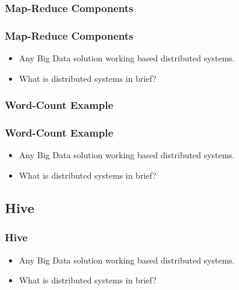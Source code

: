 
\subsubsection{Map-Reduce Components}
\begin{frame}
\frametitle{Map-Reduce Components}
\begin{itemize}[<+->]
	\item Any Big Data solution working based distributed systems.
	\item What is distributed systems in brief?
\end{itemize}
\end{frame}


\subsubsection{Word-Count Example}
\begin{frame}
\frametitle{Word-Count Example}
\begin{itemize}[<+->]
	\item Any Big Data solution working based distributed systems.
	\item What is distributed systems in brief?
\end{itemize}
\end{frame}


\subsection{Hive}
\begin{frame}
\frametitle{Hive}
\begin{itemize}[<+->]
	\item Any Big Data solution working based distributed systems.
	\item What is distributed systems in brief?
\end{itemize}
\end{frame}
